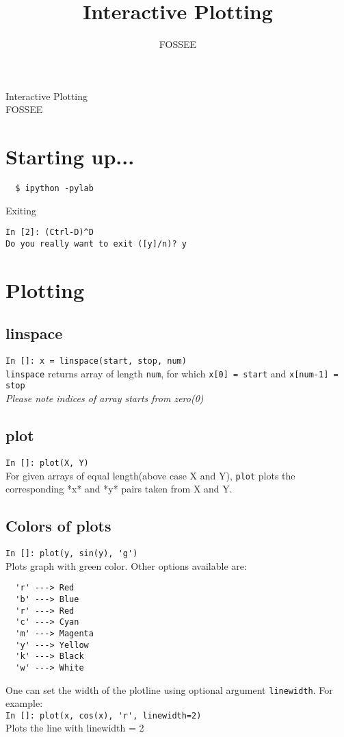\documentclass[12pt]{article}
\title{Interactive Plotting}
\author{FOSSEE}
\newcommand{\typ}[1]{\lstinline{#1}}
\begin{document}
\date{}
\vspace{-1in}
\begin{center}
\LARGE{Interactive Plotting}\\
\large{FOSSEE}
\end{center}
\section{Starting up...}

\begin{lstlisting}
  $ ipython -pylab  
\end{lstlisting}
Exiting 
\begin{lstlisting}     
In [2]: (Ctrl-D)^D
Do you really want to exit ([y]/n)? y
\end{lstlisting} %

\section{Plotting}
\subsection{linspace}
\typ{In []: x = linspace(start, stop, num)}\\
\typ{linspace} returns array of length \typ{num}, for which \typ{x[0] = start} and \typ{x[num-1] = stop} \\
\emph{Please note indices of array starts from zero(0)}

\subsection{plot}
\typ{In []: plot(X, Y)}\\
For given arrays of equal length(above case X and Y), \typ{plot} plots the corresponding *x* and *y* pairs taken from X and Y.

\subsection{Colors of plots}
\typ{In []: plot(y, sin(y), 'g')}\\
Plots graph with green color. Other options available are:
\begin{lstlisting}
  'r' ---> Red
  'b' ---> Blue
  'r' ---> Red 
  'c' ---> Cyan 
  'm' ---> Magenta
  'y' ---> Yellow
  'k' ---> Black 
  'w' ---> White
\end{lstlisting}
One can set the width of the plotline using optional argument \typ{linewidth}. For example:\\
\typ{In []: plot(x, cos(x), 'r', linewidth=2)}\\
Plots the line with linewidth = 2
\end{document}
